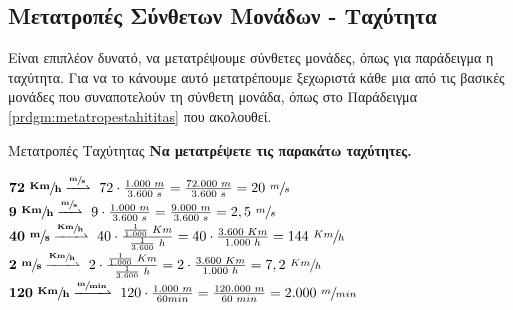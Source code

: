 \subsection{Μετατροπές Σύνθετων Μονάδων - Ταχύτητα}
Είναι επιπλέον δυνατό, να μετατρέψουμε σύνθετες μονάδες, όπως για παράδειγμα η ταχύτητα. Για να το κάνουμε αυτό μετατρέπουμε ξεχωριστά κάθε μια από τις βασικές μονάδες που συναποτελούν τη σύνθετη μονάδα, όπως στο Παράδειγμα \ref{prdgm:metatropestahititas} που ακολουθεί.
\vspace{4mm}
\begin{prdgm}[halign=flush left,label=prdgm:metatropestahititas]{Μετατροπές Ταχύτητας}
\textbf{Να μετατρέψετε τις παρακάτω ταχύτητες.}
\tcblower

$\vspace{2mm}
\mathbf{
72 }\text{ }\sfrac{\mathbf{Km}}{\mathbf{h}}
\xrightharpoonup{\sfrac{\mathbf{m}}{\mathbf{s}}} \text{ }72 \cdot \frac{1.000 \text{ }m}{3.600\text{ }s}=\frac{72.000 \text{ }m}{3.600\text{ }s}=20 \text{ }{\sfrac{m}{s}}$\\
\vspace{2mm}
$
\mathbf{
9 }\text{ }\sfrac{\mathbf{Km}}{\mathbf{h}}
\xrightharpoonup{\sfrac{\mathbf{m}}{\mathbf{s}}} \text{ }9 \cdot \frac{1.000 \text{ }m}{3.600\text{ }s}=\frac{9.000 \text{ }m}{3.600\text{ }s}=2,5 \text{ }{\sfrac{m}{s}}$\\
\vspace{2mm}
$\mathbf{
40 }\text{ }\sfrac{\mathbf{m}}{\mathbf{s}}
\xrightharpoonup{\sfrac{\mathbf{Km}}{\mathbf{h}}} \text{ }40 \cdot \frac{\frac{1}{1.000} \text{ }Km}{\frac{1}{3.600}\text{ }h}=40\cdot\frac{3.600 \text{ }Km}{1.000\text{ } h}=144 \text{ }{\sfrac{Km}{h}}$\\
\vspace{2mm}
$\mathbf{
2 }\text{ }\sfrac{\mathbf{m}}{\mathbf{s}}
\xrightharpoonup{\sfrac{\mathbf{Km}}{\mathbf{h}}} \text{ }2 \cdot \frac{\frac{1}{1.000} \text{ }Km}{\frac{1}{3.600}\text{ }h}=2\cdot\frac{3.600 \text{ }Km}{1.000\text{ } h}=7,2 \text{ }{\sfrac{Km}{h}}$\\
\vspace{2mm}
$\mathbf{
120 }\text{ }\sfrac{\mathbf{Km}}{\mathbf{h}}
\xrightharpoonup{\sfrac{\mathbf{m}}{\mathbf{min}}} \text{ }120 \cdot \frac{1.000 \text{ }m}{60 min}=\frac{120.000 \text{ }m}{60 \text{ }min}=2.000 \text{ } \sfrac{m}{min}$\\

\end{prdgm}

